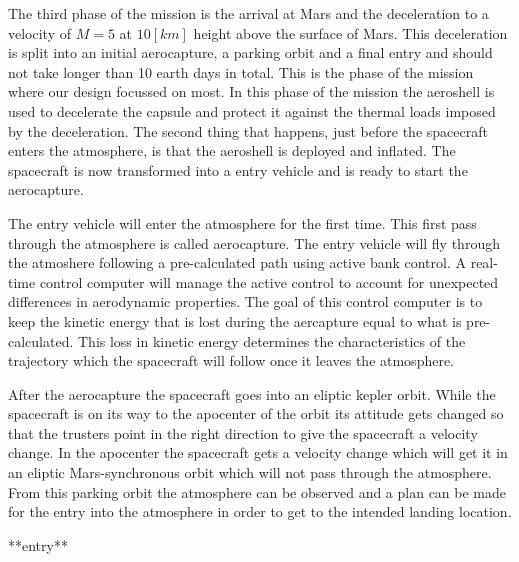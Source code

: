 The third phase of the mission is the arrival at Mars and the deceleration to a velocity of $M=5$ at $10 \left[km\right]$ height above the surface of Mars. This deceleration is split into an initial aerocapture, a parking orbit and a final entry and should not take longer than 10 earth days in total. This is the phase of the mission where our design focussed on most. In this phase of the mission the aeroshell is used to decelerate the capsule and protect it against the thermal loads imposed by the deceleration.
The second thing that happens, just before the spacecraft enters the atmosphere, is that the aeroshell is deployed and inflated. %
The spacecraft is now transformed into a entry vehicle and is ready to start the aerocapture.

The entry vehicle will enter the atmosphere for the first time. This first pass through the atmosphere is called aerocapture. The entry vehicle will fly through the atmoshere following a pre-calculated path using active bank control. A real-time control computer will manage the active control to account for unexpected differences in aerodynamic properties. The goal of this control computer is to keep the kinetic energy that is lost during the aercapture equal to what is pre-calculated. This loss in kinetic energy determines the characteristics of the trajectory which the spacecraft will follow once it leaves the atmosphere. %

After the aerocapture the spacecraft goes into an eliptic kepler orbit. While the spacecraft is on its way to the apocenter of the orbit its attitude gets changed so that the trusters point in the right direction to give the spacecraft a velocity change. In the apocenter the spacecraft gets a velocity change which will get it in an eliptic Mars-synchronous orbit which will not pass through the atmosphere. From this parking orbit the atmosphere can be observed and a plan can be made for the entry into the atmosphere in order to get to the intended landing location.

**entry**